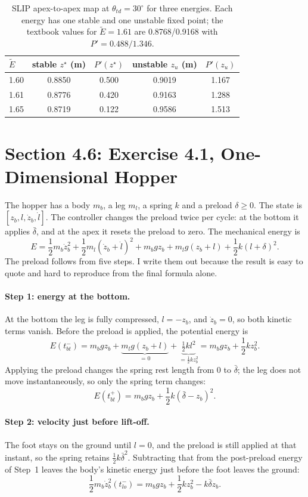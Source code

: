 \documentclass[11pt]{report}
\begin{document}
\begin{table}[!htbp]
\centering
\small
\caption{SLIP apex-to-apex map at $\theta_{td}=30^\circ$ for three energies.
Each energy has one stable and one unstable fixed point; the textbook values
for $\tilde E=1.61$ are 0.8768/0.9168 with $P'=0.488/1.346$.}
\label{tab:slip-energy}
\begin{tabular}{@{}lcccc@{}}
\toprule
$\tilde E$ & stable $z^\star$ (m) & $P'(z^\star)$ &
unstable $z_u$ (m) & $P'(z_u)$ \\
\midrule
1.60 & 0.8850 & 0.500 & 0.9019 & 1.167 \\
1.61 & 0.8776 & 0.420 & 0.9163 & 1.288 \\
1.65 & 0.8719 & 0.122 & 0.9586 & 1.513 \\
\bottomrule
\end{tabular}
\end{table}

\section{Section 4.6: Exercise 4.1, One-Dimensional Hopper}
\label{sec:s46}

The hopper has a body $m_b$, a leg $m_l$, a spring $k$ and a preload
$\delta\ge0$.  The state is $[z_b,l,\dot z_b,\dot l]$.  The controller changes
the preload twice per cycle: at the bottom it applies $\bar\delta$, and at the
apex it resets the preload to zero.  The mechanical energy is
\[
E=\frac12m_b\dot z_b^2+\frac12m_l(\dot z_b+\dot l)^2
+m_bgz_b+m_lg(z_b+l)+\frac12k(l+\delta)^2.
\]
The preload follows from five steps.  I write them out because the result is
easy to quote and hard to reproduce from the final formula alone.

\paragraph{Step 1: energy at the bottom.}
At the bottom the leg is fully compressed, $l=-z_b$, and $\dot z_b=0$, so both
kinetic terms vanish.  Before the preload is applied, the potential energy is
\[
E(t_{bt}^-)=m_bgz_b+\underbrace{m_lg(z_b+l)}_{=0}+\underbrace{\tfrac12k l^2}_{=\tfrac12k z_b^2}
=m_bgz_b+\frac12kz_b^2 .
\]
Applying the preload changes the spring rest length from $0$ to $\bar\delta$;
the leg does not move instantaneously, so only the spring term changes:
\[
E(t_{bt}^+)=m_bgz_b+\frac12k(\bar\delta-z_b)^2 .
\]

\paragraph{Step 2: velocity just before lift-off.}
The foot stays on the ground until $l=0$, and the preload is still applied at
that instant, so the spring retains $\tfrac12k\bar\delta^2$.  Subtracting that
from the post-preload energy of Step~1 leaves the body's kinetic energy just
before the foot leaves the ground:
\[
\frac12m_b\dot z_b^2(t_{lo}^-)
=m_bgz_b+\frac12kz_b^2-k\bar\delta z_b .
\]
\end{document}
